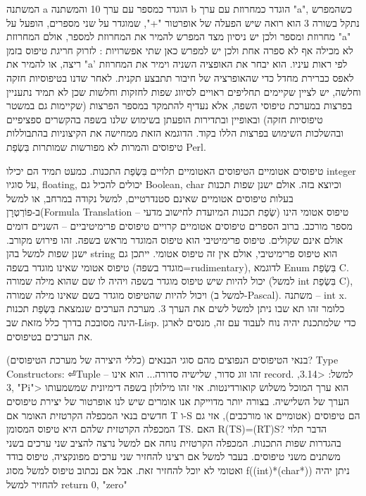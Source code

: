 \begin{טבלא}[!htbp]
      המשתנה a הוגדר כמספר עם ערך 10 והמשתנה b הוגדר כמחרוזת עם ערך "a", כשהמפרש נתקל בשורה 3 הוא רואה שיש הפעלה של אופרטור "+", שמוגדר על שני מספרים, הופעל על מחרוזת ומספר ולכן יש ניסיון מצד המפרש להמיר את המחרוזת למספר, אולם המחרוזת "a" לא מכילה אף לא ספרה אחת ולכן יש למפרש כאן שתי אפשרויות : לזרוק חריגת טיפוס בזמן ריצה, או להמיר את "a' לפי ראות עיניו. הוא יבחר את האופציה השניה וימיר את המחרוזת לאפס כברירת מחדל כדי שהאופרציה של חיבור תתבצע תקנית.
      לאחר שדנו בטיפוסיות חזקה וחלשה, יש לציין שקיימים תחליפים ראויים לסיווג שפות לחזקות וחלשות שכן לא תמיד נתעניין בפרצות במערכת טיפוסי השפה, אלא נעדיף להתמקד במספר הפרצות (שקיימות גם במשטר טיפוסיות חזקה) ובאופיין ובתדירות הופעתן בשימוש שלנו בשפה בהקשרים ספציפיים ובהשלכות השימוש בפרצות הללו בקוד. הדוגמא הזאת ממחישה את הקיצוניות בהתבוללות טיפוסים והמרות לא מפורשות שמותרות בִּשְׂפַת Perl.

      טיפוסים אטומיים
      הטיפוסים האטומיים תלויים בִּשְׂפַת התכנות. כמעט תמיד הם יכילו integer על סוגיו, floating, יכולים להכיל גם Boolean, char וכיוצא בזה. אולם ישנן שפות תכנות בעלות טיפוסים אטומיים שאינם סטנדרטיים, למשל נקודה במרחב, או למשל ב-פוֹרְטְרָן(Formula Translation – שְׂפַת תכנות המיועדת לחישוב מדעי) טיפוס אטומי הינו מספר מורכב.
      ברוב הספרים טיפוסים אטומיים קרויים טיפוסים פרימיטיביים – השניים דומים אולם אינם שקולים. טיפוס פרימיטיבי הוא טיפוס המוגדר מראש בשפה. זהו פירוש מקורב. ישנן שפות למשל בהן string הוא טיפוס פרימיטיבי, אולם אין זה טיפוס אטומי. ייתכן גם טיפוס אטומי שאינו מוגדר בשפה (מוגדר בשפה=rudimentary), לדוגמא Enum בִּשְׂפַת C.
      יכול להיות שיש טיפוס מוגדר בשפה ויהיה לו שם שהוא מילה שמורה (למשל int בִּשְׂפַת C), ויכול להיות שהטיפוס מוגדר בשם שאינו מילה שמורה (למשל ב-Pascal).
      משתנה – int x. כלומר זהו תא שבו ניתן למשל לשים את הערך 3.
      מערכת הערכים שנמצאת בִּשְׂפַת תכנות הינה מסובכת בדרך כלל מזאת שב-Lisp. כדי שלמתכנת יהיה נוח לעבוד עם זה, מנסים לארגן את הערכים בטיפוסים.

      בנאי הטיפוסים הנפוצים
      מהם סוגי הבנאים (כללי היצירה של מערכת הטיפוסים)? Type Constructors:
⏎Tuple – זהו זוג סדור, שלישיה סדורה... הוא אינו record.
      למשל: <3.14, 3, "Pi"> הוא ערך המוכל משלוש קואורדינטות. אזי זהו מילולון בשפה דימיונית שמשמעותו הערך של השלישיה.
      בצורה יותר מדוייקת אנו אומרים שיש לנו אופרטור של יצירת טיפוסים חדשים בנאי המכפלה הקרטזית האומר
      אם T ו-S הם טיפוסים (אטומיים או מורכבים), אזי גם המכפלה הקרטזית שלהם היא טיפוס המסומן TS.
      האם R(TS)=(RT)S? הדבר תלוי בהגדרות שפות התכנות. המכפלה הקרטזית נוחה אם למשל נרצה להציב שני ערכים בשני משתנים משני טיפוסים. בעבר למשל אם רצינו להחזיר שני ערכים מפונקציה, טיפוס בודד ואטומי לא יוכל להחזיר זאת. אבל אם נכתוב טיפוס למשל מסוג f((int)*(char*)){}
      ניתן יהיה להחזיר למשל return 0, "zero"


\end{טבלא}
